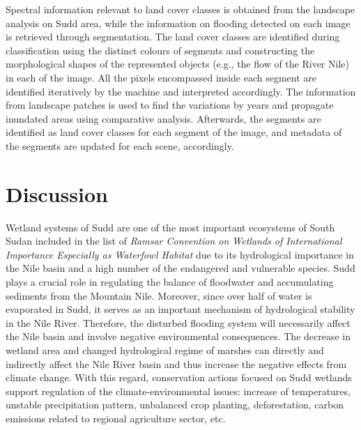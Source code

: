 \documentclass[analytics,article,submit,pdftex,moreauthors]{Definitions/mdpi}
\begin{document}
Spectral information relevant to land cover classes is obtained from the landscape analysis on Sudd area, while the information on flooding detected on each image is retrieved through segmentation. The land cover classes are identified during classification using the distinct colours of segments and constructing the morphological shapes of the represented objects (e.g., the flow of the River Nile) in each of the image. All the pixels encompassed inside each segment are identified iteratively by the machine and interpreted accordingly. The information from landscape patches is used to find the variations by years and propagate inundated areas using comparative analysis. Afterwards, the segments are identified as land cover classes for each segment of the image, and metadata of the segments are updated for each scene, accordingly. 

\section{Discussion}

Wetland systems of Sudd are one of the most important ecosystems of South Sudan included in the list of \emph{Ramsar Convention on Wetlands of International Importance Especially as Waterfowl Habitat} due to its hydrological importance in the Nile basin and a high number of the endangered and vulnerable species. Sudd plays a crucial role in regulating the balance of floodwater and accumulating sediments from the Mountain Nile. Moreover, since over half of water is evaporated in Sudd, it serves as an important mechanism of hydrological stability in the Nile River. Therefore, the disturbed flooding system will necessarily affect the Nile basin and involve negative environmental consequences. The decrease in wetland area and changed hydrological regime of marshes can directly and indirectly affect the Nile River basin and thus increase the negative effects from climate change. With this regard, conservation actions focused on Sudd wetlands support regulation of the climate-environmental issues: increase of temperatures, unstable precipitation pattern, unbalanced crop planting, deforestation, carbon emissions related to regional agriculture sector, etc.
\end{document}
